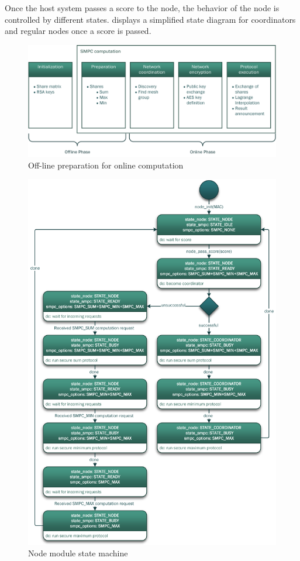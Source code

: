 Once the host system passes a score to the node, the behavior of the node is controlled by different states.  displays a simplified state diagram for coordinators and regular nodes once a score is passed.

\begin{figure}[!htbp] %
	\caption{Off-line preparation for online computation} \label{figure:Off-line preparation for online computation}
	\includegraphics[scale=1.0]{figures/node_phases.png}
\end{figure}

\begin{figure}[!htbp] %
	\caption{Node module state machine} \label{Node module state machine}
	\includegraphics[scale=1.0]{figures/node_states.png}
\end{figure}

